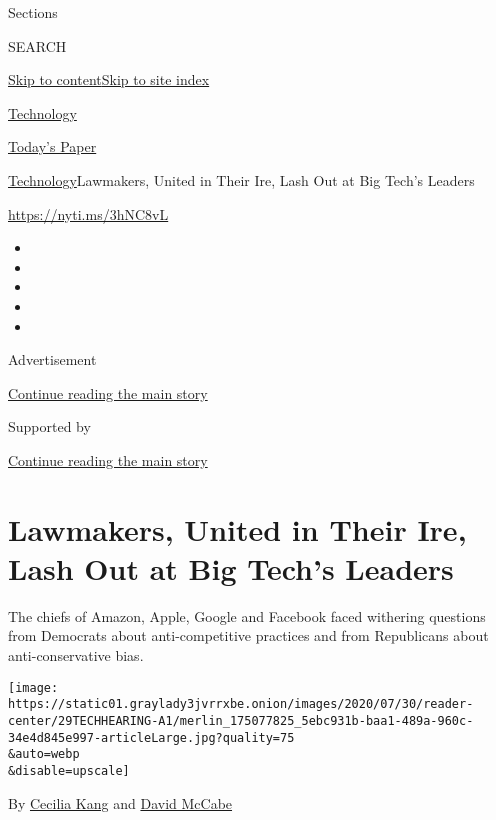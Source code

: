 Sections

SEARCH

\protect\hyperlink{site-content}{Skip to
content}\protect\hyperlink{site-index}{Skip to site index}

\href{https://www.nytimes3xbfgragh.onion/section/technology}{Technology}

\href{https://myaccount.nytimes3xbfgragh.onion/auth/login?response_type=cookie\&client_id=vi}{}

\href{https://www.nytimes3xbfgragh.onion/section/todayspaper}{Today's
Paper}

\href{/section/technology}{Technology}\textbar{}Lawmakers, United in
Their Ire, Lash Out at Big Tech's Leaders

\href{https://nyti.ms/3hNC8vL}{https://nyti.ms/3hNC8vL}

\begin{itemize}
\item
\item
\item
\item
\item
\end{itemize}

Advertisement

\protect\hyperlink{after-top}{Continue reading the main story}

Supported by

\protect\hyperlink{after-sponsor}{Continue reading the main story}

\hypertarget{lawmakers-united-in-their-ire-lash-out-at-big-techs-leaders}{%
\section{Lawmakers, United in Their Ire, Lash Out at Big Tech's
Leaders}\label{lawmakers-united-in-their-ire-lash-out-at-big-techs-leaders}}

The chiefs of Amazon, Apple, Google and Facebook faced withering
questions from Democrats about anti-competitive practices and from
Republicans about anti-conservative bias.

\texttt{[image: https://static01.graylady3jvrrxbe.onion/images/2020/07/30/reader-center/29TECHHEARING-A1/merlin\_175077825\_5ebc931b-baa1-489a-960c-34e4d845e997-articleLarge.jpg?quality=75\\\&auto=webp\\\&disable=upscale]}

By \href{https://www.nytimes3xbfgragh.onion/by/cecilia-kang}{Cecilia
Kang} and
\href{https://www.nytimes3xbfgragh.onion/by/david-mccabe}{David McCabe}

